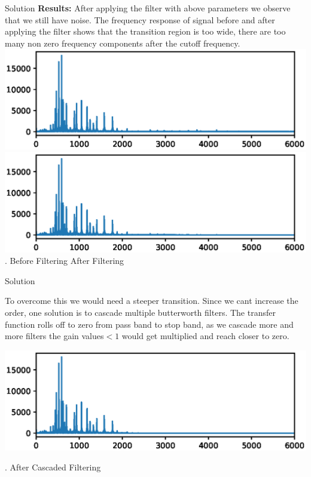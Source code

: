 \documentclass{beamer}
\begin{document}
\begin{frame}{Solution}
\textbf{Results:}
    After applying the filter with above parameters we observe that we still have noise. The frequency response of signal before and after applying the filter shows that the transition region is too wide, there are too many non zero frequency components after the cutoff frequency. \\
  \includegraphics[scale =0.35]{./figures/before.eps} 
  \includegraphics[scale =0.35]{./figures/after-1.eps} 
  .\hspace{1cm} Before Filtering \hspace{3cm}     After Filtering
\end{frame}


\begin{frame}{Solution}

    To overcome this we would need a steeper transition. Since we cant increase the order, one solution is to cascade multiple butterworth filters. The transfer function rolls off to zero from pass band to stop band, as we cascade more and more filters the gain values$<1$ would get multiplied and reach closer to zero.
    \begin{center}
        \includegraphics[scale =0.5]{./figures/after-2.eps} 
    \end{center}
    .\hspace{3cm} After Cascaded Filtering
\end{frame}
\end{document}
